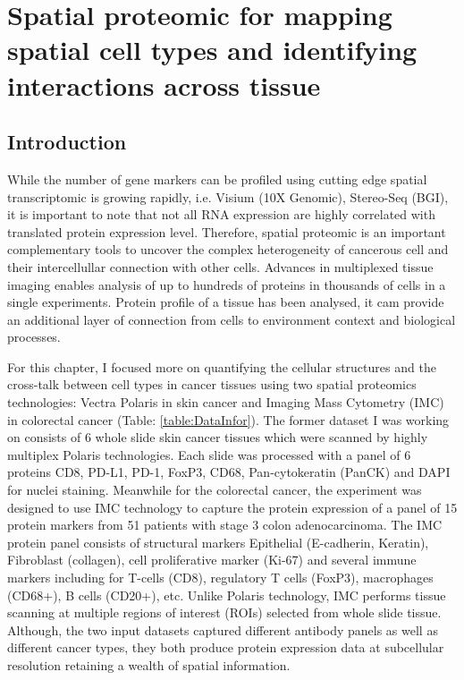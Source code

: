 \chapter[Spatial proteomic for mapping spatial cell types and identifying interactions across tissue]{Spatial proteomic for mapping spatial cell types and identifying interactions across tissue}
\label{Chap:3}	%
\pagestyle{headings}
\section{Introduction}
\label{Sec:3.1_intro}
While the number of gene markers can be profiled using cutting edge spatial transcriptomic is growing rapidly, i.e. Visium (10X Genomic),  Stereo-Seq (BGI), it is important to note that not all RNA expression are highly correlated with translated protein expression level. Therefore, spatial proteomic is an important complementary tools to uncover the complex heterogeneity of cancerous cell and their intercellullar connection with other cells. Advances in multiplexed tissue imaging enables analysis of up to hundreds of proteins in thousands of cells in a single experiments. Protein profile of a tissue has been analysed, it cam provide an additional layer of connection from cells to environment context and biological processes. 

For this chapter, I focused more on quantifying the cellular structures and the cross-talk between cell types in cancer tissues using two spatial proteomics technologies: Vectra Polaris in skin cancer and Imaging Mass Cytometry (IMC) \cite{giesen2014IMC} in colorectal cancer (Table: \ref{table:DataInfor}). The former dataset I was working on  consists of 6 whole slide skin cancer tissues which were scanned by highly multiplex Polaris technologies. Each slide was processed with a panel of 6 proteins CD8, PD-L1, PD-1, FoxP3, CD68, Pan-cytokeratin (PanCK) and DAPI for nuclei staining. Meanwhile for the colorectal cancer, the experiment was designed to use IMC technology to capture the protein expression of a panel of 15 protein markers from 51 patients with stage 3 colon adenocarcinoma. The IMC protein panel consists of structural markers  Epithelial (E-cadherin, Keratin), Fibroblast (collagen), cell proliferative marker (Ki-67) and several immune markers including for T-cells (CD8), regulatory T cells (FoxP3), macrophages (CD68+), B cells (CD20+), etc. Unlike Polaris technology, IMC performs tissue scanning at multiple regions of interest (ROIs) selected from whole slide tissue. Although, the two input datasets captured different antibody panels as well as different cancer types, they both produce protein expression data at subcellular resolution retaining  a wealth of spatial information.    

